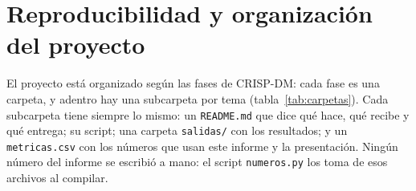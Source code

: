 \appendix
\addto\captionsspanish{\renewcommand{\appendixname}{Anexo}}
\renewcommand{\appendixname}{Anexo}
\chapter{Reproducibilidad y organización del proyecto}
\label{anx:repro}

El proyecto está organizado según las fases de CRISP-DM: cada fase es una carpeta, y adentro hay una
subcarpeta por tema (tabla~\ref{tab:carpetas}). Cada subcarpeta tiene siempre lo mismo: un
\texttt{README.md} que dice qué hace, qué recibe y qué entrega; su script; una carpeta
\texttt{salidas/} con los resultados; y un \texttt{metricas.csv} con los números que usan este
informe y la presentación. Ningún número del informe se escribió a mano: el script
\texttt{numeros.py} los toma de esos archivos al compilar.

